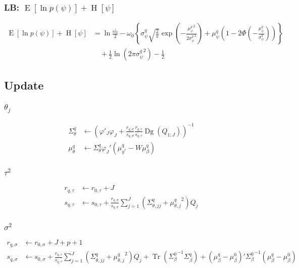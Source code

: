 \documentclass[11pt]{article}
\DeclareMathOperator{\Tr}{Tr}
\newcommand{\opn}{\operatorname}
\begin{document}
\subsubsection{LB: $\opn{E}\left[\ln p\left(\psi\right)\right] +\opn{H}\left[\psi\right]$}
\begin{align*}
  \opn{E}\left[\ln p\left(\psi\right)\right] +\opn{H}\left[\psi\right] &= \ln\frac{\omega_{0}}{2} -\omega_{0}\left\{\sigma_{\psi}^{q}\sqrt{\frac{2}{\pi}} \exp\left(-\frac{{\mu_{\psi}^{q}}^{2}}{2{\sigma_{\psi}^{q}}^{2}}\right) + \mu_{\psi}^{q}\left(1-2\Phi\left(-\frac{\mu_{\psi}^{q}}{\sigma_{\psi}^{q}}\right)\right) \right\}\\
  &\quad +\frac{1}{2}\ln\left(2\pi {\sigma_{\psi}^{q}}^{2}\right) -\frac{1}{2}
\end{align*}
\subsection{Update}
\subsubsection{$\theta_{j}$}
\begin{align*}
  \Sigma_{\theta}^{q} &\leftarrow \left(\varphi'_{J}\varphi_{J} +\frac{r_{q,\sigma}}{s_{q,\sigma}}\frac{r_{q,\tau}}{s_{q,\tau}}\opn{Dg}\left(Q_{1:J}\right) \right)^{-1}\\
  \mu_{\theta}^{q} &\leftarrow \Sigma_{\theta}^{q}\varphi_{J}'\left(\mu_{y^{*}}^{q}-W\mu_{\beta}^{q}\right)
\end{align*}
\subsubsection{$\tau^{2}$}
\begin{align*}
  r_{q,\tau} &\leftarrow r_{0,\tau} +J\\
  s_{q,\tau} &\leftarrow s_{0,\tau} + \frac{r_{q,\sigma}}{s_{q,\sigma}}\sum_{j=1}^{J}\left(\Sigma_{\theta, jj}^{q}+{\mu_{\theta, j}^{q}}^{2}\right)Q_{j}
\end{align*}
\subsubsection{$\sigma^{2}$}
\begin{align*}
  r_{q,\sigma} &\leftarrow r_{0,\sigma} + J + p + 1\\
  s_{q,\sigma} &\leftarrow s_{0,\sigma} +\frac{r_{q,\tau}}{s_{q,\tau}}\sum_{j=1}^{J}\left(\Sigma_{\theta, jj}^{q}+{\mu_{\theta, j}^{q}}^{2}\right)Q_{j} + \Tr\left({\Sigma_{\beta}^{0}}^{-1}\Sigma_{\beta}^{q}\right) +\left(\mu_{\beta}^{q}-\mu_{\beta}^{0}\right)'{\Sigma_{\beta}^{0}}^{-1}\left(\mu_{\beta}^{q}-\mu_{\beta}^{0}\right)
\end{align*}
\end{document}
